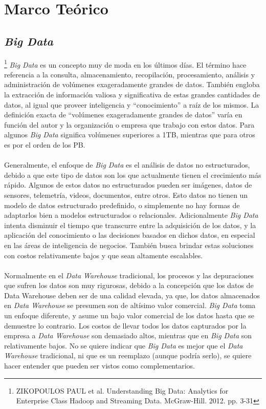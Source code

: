 \section{Marco Te\'orico}
\subsection{\textit{Big Data}}\footnote{ZIKOPOULOS PAUL et al. Understanding Big Data: Analytics for Enterprise Class Hadoop and Streaming Data. McGraw-Hill. 2012. pp. 3-31}
\textit{Big Data} es un concepto muy de moda en los \'ultimos d\'ias. El t\'ermino hace referencia a la consulta, almacenamiento, recopilaci\'on, procesamiento, an\'alisis y administraci\'on de vol\'umenes exageradamente grandes de datos. Tambi\'en engloba la extracci\'on de informaci\'on valiosa y significativa de estas grandes cantidades de datos, al igual que proveer inteligencia y “conocimiento” a ra\'iz de los mismos. La definici\'on exacta de “vol\'umenes exageradamente grandes de datos” var\'ia en funci\'on del autor y la organizaci\'on o empresa que trabajo con estos datos. Para algunos \textit{Big Data} significa vol\'umenes superiores a 1TB, mientras que para otros es por el orden de los PB.
\paragraph{}
Generalmente, el enfoque de \textit{Big Data} es el an\'alisis de datos no estructurados, debido a que este tipo de datos son los que actualmente tienen el crecimiento m\'as r\'apido. Algunos de estos datos no estructurados pueden ser im\'agenes, datos de sensores, telemetr\'ia, videos, documentos, entre otros. Esto datos no tienen un modelo de datos estructurado predefinido, o simplemente no hay formas de adaptarlos bien a modelos estructurados o relacionales. Adicionalmente \textit{Big Data} intenta disminuir el tiempo que transcurre entre la adquisici\'on de los datos, y la aplicaci\'on del conocimiento o las decisiones basados en dichos datos, en especial en las \'areas de inteligencia de negocios. Tambi\'en busca brindar estas soluciones con costos relativamente bajos y que sean altamente escalables.
\paragraph{}
Normalmente en el \textit{Data Warehouse} tradicional, los procesos y las depuraciones que sufren los datos son muy rigurosas, debido a la concepci\'on que los datos de Data Warehouse deben ser de una calidad elevada, ya que, los datos almacenados en \textit{Data Warehouse} se presumen son de alt\'isimo valor comercial. \textit{Big Data} toma un enfoque diferente, y asume un bajo valor comercial de los datos hasta que se demuestre lo contrario. Los costos de llevar todos los datos capturados por la empresa a \textit{Data Warehouse} son demasiado altos, mientras que en \textit{Big Data} son relativamente bajos. No se quiere indicar que \textit{Big Data} es mejor que el \textit{Data Warehouse} tradicional, ni que es un reemplazo (aunque podr\'ia serlo), se quiere hacer entender que pueden ser vistos
como complementarios.
